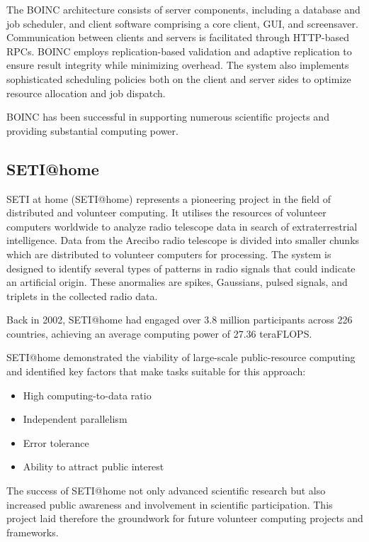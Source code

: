 The BOINC architecture consists of server components, including a database and job scheduler, and client software comprising a core client, GUI, and screensaver. Communication between clients and servers is facilitated through HTTP-based RPCs. BOINC employs replication-based validation and adaptive replication to ensure result integrity while minimizing overhead. The system also implements sophisticated scheduling policies both on the client and server sides to optimize resource allocation and job dispatch. \cite{relatedwork:boinc1}

BOINC has been successful in supporting numerous scientific projects and providing substantial computing power. \cite{relatedwork:boinc1}

\subsection{SETI@home}
\label{subsec:background:related_work:seti}
\ac{SETI} at home (SETI@home) represents a pioneering project in the field of distributed and volunteer computing. It utilises the resources of volunteer computers worldwide to analyze radio telescope data in search of extraterrestrial intelligence. Data from the Arecibo radio telescope is divided into smaller chunks which are distributed to volunteer computers for processing. The system is designed to identify several types of patterns in radio signals that could indicate an artificial origin. These anormalies are spikes, Gaussians, pulsed signals, and triplets in the collected radio data. \cite{relatedwork:seti}

Back in 2002, \ac{SETI}@home had engaged over 3.8 million participants across 226 countries, achieving an average computing power of 27.36 teraFLOPS. \cite{relatedwork:seti}

\ac{SETI}@home demonstrated the viability of large-scale public-resource computing and identified key factors that make tasks suitable for this approach:
\begin{itemize}
  \item High computing-to-data ratio
  \item Independent parallelism
  \item Error tolerance
  \item Ability to attract public interest
\end{itemize}

The success of \ac{SETI}@home not only advanced scientific research but also increased public awareness and involvement in scientific participation. This project laid therefore the groundwork for future volunteer computing projects and frameworks. \cite{relatedwork:seti}

